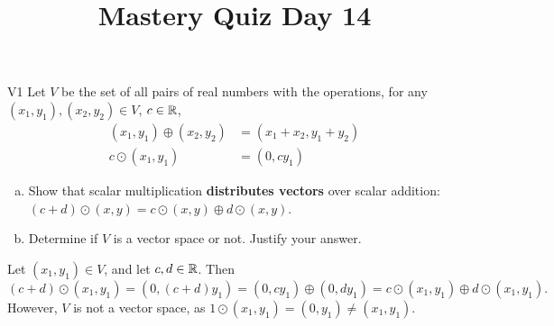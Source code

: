 \documentclass{sbgLAquiz}
\title{Mastery Quiz Day 14 }
\begin{document}
\begin{problem}{V1}
Let $V$ be the set of all pairs of real numbers with the operations, for any $(x_1,y_1), (x_2,y_2) \in V$, $c \in \mathbb{R}$,
\begin{align*}
(x_1,y_1) \oplus (x_2,y_2) &= (x_1+x_2,y_1+y_2) \\
c \odot (x_1,y_1) &= (0, cy_1)
\end{align*}
\begin{enumerate}[(a)]
\item Show that scalar multiplication
      \textbf{distributes vectors} over scalar addition:
      \((c+d)\odot(x,y)=
      c\odot(x,y) \oplus d\odot(x,y)\).
\item Determine if $V$ is a vector space or not.  Justify your answer.
\end{enumerate}
\end{problem}
\begin{solution}
Let $(x_1,y_1) \in V$, and let $c,d \in \mathbb{R}$.  Then
$$(c+d)\odot (x_1,y_1)=(0, (c+d)y_1) = (0,cy_1) \oplus (0,dy_1) = c \odot (x_1,y_1) \oplus d \odot (x_1,y_1).$$
However, $V$ is not a vector space, as $1 \odot (x_1,y_1) = (0,y_1) \neq (x_1,y_1)$.
\end{solution}
\end{document}
